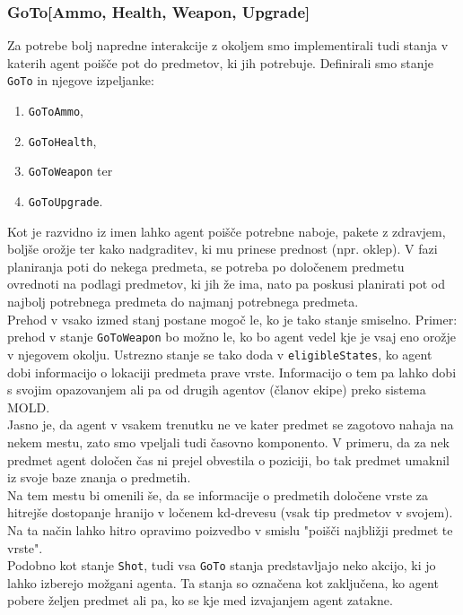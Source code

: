 \documentclass[a4paper,10pt]{article}
\begin{document}
\subsubsection{GoTo[Ammo, Health, Weapon, Upgrade]}
Za potrebe bolj napredne interakcije z okoljem smo implementirali tudi stanja v katerih agent poišče pot do predmetov, ki jih potrebuje.
Definirali smo stanje \verb+GoTo+ in njegove izpeljanke:
\begin{enumerate}
 \item \verb+GoToAmmo+,
 \item \verb+GoToHealth+,
 \item \verb+GoToWeapon+ ter
 \item \verb+GoToUpgrade+.
\end{enumerate}
Kot je razvidno iz imen lahko agent poišče potrebne naboje, pakete z zdravjem, boljše orožje ter kako nadgraditev, ki mu prinese prednost (npr. 
oklep). V fazi planiranja poti do nekega predmeta, se potreba po določenem predmetu ovrednoti na podlagi predmetov, ki jih že ima, nato pa poskusi
planirati pot od najbolj potrebnega predmeta do najmanj potrebnega predmeta.\\
Prehod v vsako izmed stanj postane mogoč le, ko je tako stanje smiselno. Primer: prehod v stanje \verb+GoToWeapon+ bo možno le, ko bo agent
vedel kje je vsaj eno orožje v njegovem okolju. Ustrezno stanje se tako doda v \verb+eligibleStates+, ko agent dobi informacijo o lokaciji predmeta
prave vrste. Informacijo o tem pa lahko dobi s svojim opazovanjem ali pa od drugih agentov (članov ekipe) preko sistema MOLD.\\ 
Jasno je, da agent v vsakem trenutku ne ve kater predmet se zagotovo nahaja na nekem mestu, zato smo vpeljali tudi časovno komponento. V primeru, da 
za nek predmet agent določen čas ni prejel obvestila o poziciji, bo tak predmet umaknil iz svoje baze znanja o predmetih.\\
Na tem mestu bi omenili še, da se informacije o predmetih določene vrste za hitrejše dostopanje hranijo v ločenem kd-drevesu (vsak tip predmetov v svojem). 
Na ta način lahko hitro opravimo poizvedbo v smislu "poišči najbližji predmet te vrste".\\
Podobno kot stanje \verb+Shot+, tudi vsa \verb+GoTo+ stanja predstavljajo neko akcijo, ki jo lahko izberejo možgani agenta. Ta stanja so označena kot zaključena,
ko agent pobere željen predmet ali pa, ko se kje med izvajanjem agent zatakne. 
\end{document}

